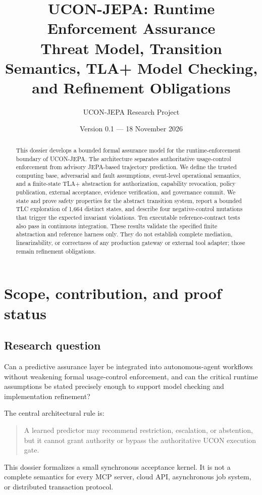 \documentclass[11pt,a4paper]{article}
\title{UCON-JEPA: Runtime Enforcement Assurance\\
\large Threat Model, Transition Semantics, TLA+ Model Checking, and Refinement Obligations}
\author{UCON-JEPA Research Project}
\date{Version 0.1 --- 18 November 2026}
\theoremstyle{remark}
\begin{document}
\maketitle

\begin{abstract}
This dossier develops a bounded formal assurance model for the runtime-enforcement boundary of UCON-JEPA. The architecture separates authoritative usage-control enforcement from advisory JEPA-based trajectory prediction. We define the trusted computing base, adversarial and fault assumptions, event-level operational semantics, and a finite-state TLA+ abstraction for authorization, capability revocation, policy publication, external acceptance, evidence verification, and governance commit. We state and prove safety properties for the abstract transition system, report a bounded TLC exploration of 1,664 distinct states, and describe four negative-control mutations that trigger the expected invariant violations. Ten executable reference-contract tests also pass in continuous integration. These results validate the specified finite abstraction and reference harness only. They do not establish complete mediation, linearizability, or correctness of any production gateway or external tool adapter; those remain refinement obligations.
\end{abstract}

\tableofcontents

\section{Scope, contribution, and proof status}

\subsection{Research question}

Can a predictive assurance layer be integrated into autonomous-agent workflows without weakening formal usage-control enforcement, and can the critical runtime assumptions be stated precisely enough to support model checking and implementation refinement?

The central architectural rule is:
\begin{quote}
A learned predictor may recommend restriction, escalation, or abstention, but it cannot grant authority or bypass the authoritative UCON execution gate.
\end{quote}

This dossier formalizes a small synchronous acceptance kernel. It is not a complete semantics for every MCP server, cloud API, asynchronous job system, or distributed transaction protocol.
\end{document}
